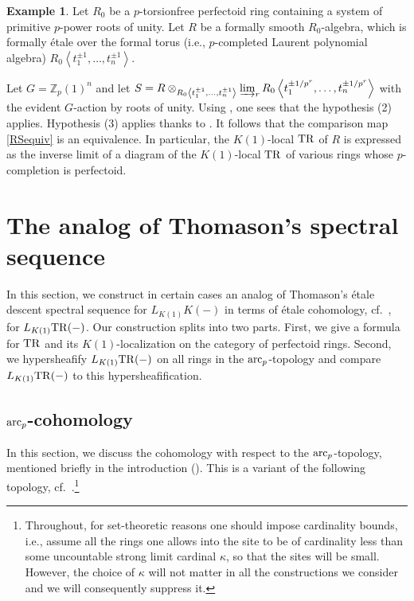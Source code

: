 \documentclass{amsart}
\theoremstyle{definition}
\newtheorem{example}[theorem]{Example}
\begin{document}
\begin{example} 
\label{smoothoverOC}
Let $R_0$ be a 
$p$-torsionfree perfectoid ring containing a system of primitive $p$-power roots
of unity. 
Let $R$ be a formally smooth $R_0$-algebra, which is formally \'etale over the
formal torus  (i.e., $p$-completed Laurent polynomial algebra) $R_0 \left \langle  t_1^{\pm 1}, \dots,
t_n^{\pm 1} \right\rangle$. 

Let $ G =\mathbb{Z}_p(1)^n$ and let 
$S = R \otimes_{R_0\left \langle  t_1^{\pm 1}, \dots, t_n^{\pm 1}
\right \rangle
}
\varinjlim_r
R_0 \left \langle  t_1^{\pm 1/p^r}, \dots, t_n^{\pm
1/p^r} \right \rangle $ with the evident $G$-action by roots of unity. 
Using , one sees that the 
hypothesis (2) applies. 
Hypothesis (3) applies thanks to . 
It follows that 
the comparison map 
\eqref{RSequiv} is an equivalence. 
In particular, the $K(1)$-local $\mathrm{TR}$ of $R$ is expressed as the inverse limit
of a diagram of the $K(1)$-local $\mathrm{TR}$ of various rings whose $p$-completion is
perfectoid.  
\end{example} 

\section{The analog of Thomason's spectral sequence}

\newcommand{\perfd}{\mathrm{Perfd}}
\newcommand{\pf}{\mathrm{perfd}}


In this section, we construct in certain cases an analog of Thomason's \'etale
descent 
spectral sequence for $L_{K(1)} K(-)$ in terms of \'etale cohomology,
cf.~\cite{Tho85, TT90}, for $L_{K(1)} \mathrm{TR}(-)$. Our construction splits into two
parts. First, we give a formula for $\mathrm{TR}$ and its $K(1)$-localization on the
 category of perfectoid rings. 
Second, we hypersheafify $L_{K(1)} \mathrm{TR}(-)$ on all rings in the $\mathrm{arc}_{{p}}$-topology and
compare 
$L_{K(1)} \mathrm{TR}(-)$ to this hypersheafification. 


\subsection{$\mathrm{arc}_{{p}}$-cohomology}
In this section, we discuss the cohomology with respect to the $\mathrm{arc}_{{p}}$-topology,
mentioned briefly in the introduction (). 
This is a variant of the following topology,
cf.~\cite[Sec.~2.2.1]{CS}.\footnote{Throughout, for set-theoretic reasons one
should impose cardinality bounds, i.e., assume all the rings one allows into the
site to be of cardinality less than some uncountable strong limit
cardinal $\kappa$, so that the sites will be small.
However, the choice of $\kappa$ will not matter in all the constructions we
consider and we will consequently suppress it. } 
\end{document}
